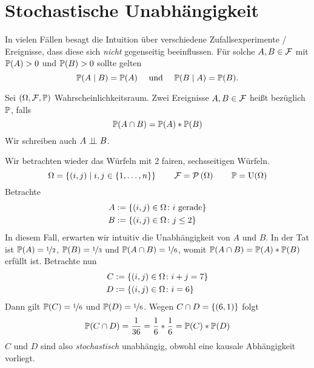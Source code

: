 \section{Stochastische Unabhängigkeit} \label{sec: unabhaengigkeit}
In vielen Fällen besagt die Intuition über verschiedene Zufallsexperimente / Ereignisse, dass diese sich \textit{nicht} gegenseitig beeinflussen. Für solche $A,B \in \F$ mit $\P(A) > 0$ und $\P(B) > 0$ sollte gelten
\begin{equation*}
	\P(A\mid B) = \P(A) \quad \und \quad \P(B\mid A) = \P(B).
\end{equation*}

\begin{definition} \label{def: 3_2_11}
	Sei $(\Omega, \F, \P)$ Wahrscheinlichkeitsraum. Zwei Ereignisse $A,B \in \F$ heißt  bezüglich $\P$, falls
	\begin{equation*}
		\P(A\cap B) = \P(A) * \P(B)
	\end{equation*}
	Wir schreiben auch $A \upmodels B$.
\end{definition}

\begin{beispiel}
	Wir betrachten wieder das Würfeln mit 2 fairen, sechsseitigen Würfeln. 
	\begin{equation*}
		\Omega = \menge{(i,j) \mid i,j \in\menge{1,\dots,n}} \qquad 
		\F = \pows\Omega \qquad 
		\P = \Uni(\Omega)
	\end{equation*}
	Betrachte
	\begin{equation*}
	\begin{aligned}
		A &\defeq \menge{(i,j) \in \Omega \colon i \text{ gerade}}\\
		B &\defeq \menge{(i,j) \in \Omega \colon j \leq 2}
	\end{aligned}
	\end{equation*}
	In diesem Fall, erwarten wir intuitiv die Unabhängigkeit von $A$ und $B$.
	In der Tat ist $\P(A) = \lfrac{1}{2}$, $\P(B) = \lfrac{1}{3}$ und $\P(A\cap B) = \lfrac{1}{6}$, womit $\P(A \cap B) = \P(A) * \P(B)$ erfüllt ist.
	Betrachte nun
	\begin{equation*}
	\begin{aligned}
		C &\defeq \menge{(i,j) \in \Omega \colon i + j = 7}\\
		D &\defeq \menge{(i,j) \in \Omega \colon i = 6}
	\end{aligned}
	\end{equation*}
	Dann gilt $\P(C) = \lfrac{1}{6}$ und $\P(D) = \lfrac{1}{6}$. Wegen $C \cap D = \menge{(6,1)}$ folgt
	\begin{equation*}
		\P(C\cap D) = \frac{1}{36} = \frac{1}{6} * \frac{1}{6} = \P(C) * \P(D)
	\end{equation*}
	$C$ und $D$ sind also \textit{stochastisch} unabhängig, obwohl eine kausale Abhängigkeit vorliegt.
\end{beispiel}

